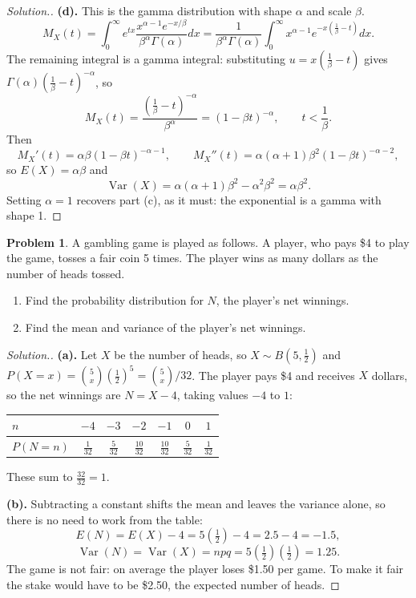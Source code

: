 \documentclass[12pt,a4paper]{report}
\theoremstyle{definition}
\theoremstyle{plain}
\theoremstyle{definition}
\newtheorem{problemx}{Problem}[section]
\newenvironment{problem}{\begin{problemx}}{\end{problemx}}
\newenvironment{solution}
  {\renewcommand{\qedsymbol}{}\begin{proof}[\textit{Solution}.]}
  {\end{proof}}
\begin{document}
\begin{solution}
\textbf{(d).} This is the gamma distribution with shape $\alpha$ and scale $\beta$.
\[M_X(t) = \int_0^{\infty}e^{tx}\frac{x^{\alpha-1}e^{-x/\beta}}{\beta^{\alpha}\Gamma(\alpha)}dx
 = \frac{1}{\beta^{\alpha}\Gamma(\alpha)}\int_0^{\infty}x^{\alpha-1}
   e^{-x\left(\frac{1}{\beta}-t\right)}dx.\]
The remaining integral is a gamma integral: substituting
$u = x\left(\tfrac{1}{\beta}-t\right)$ gives
$\Gamma(\alpha)\left(\tfrac{1}{\beta}-t\right)^{-\alpha}$, so
\[M_X(t) = \frac{\left(\frac{1}{\beta}-t\right)^{-\alpha}}{\beta^{\alpha}}
 = (1-\beta t)^{-\alpha}, \qquad t<\frac{1}{\beta}.\]
Then
\[M_X'(t) = \alpha\beta(1-\beta t)^{-\alpha-1},\qquad
M_X''(t) = \alpha(\alpha+1)\beta^{2}(1-\beta t)^{-\alpha-2},\]
so $E(X) = \alpha\beta$ and
\[\operatorname{Var}(X) = \alpha(\alpha+1)\beta^{2}-\alpha^{2}\beta^{2} = \alpha\beta^{2}.\]
Setting $\alpha = 1$ recovers part (c), as it must: the exponential is a gamma with
shape 1.
\end{solution}

\begin{problem}
A gambling game is played as follows. A player, who pays \$4 to play the game, tosses a
fair coin 5 times. The player wins as many dollars as the number of heads tossed.
\begin{enumerate}
\item[(a).] Find the probability distribution for $N$, the player's net winnings.
\item[(b).] Find the mean and variance of the player's net winnings.
\end{enumerate}
\end{problem}

\begin{solution}
\textbf{(a).} Let $X$ be the number of heads, so $X\sim B\left(5,\tfrac12\right)$ and
$P(X=x) = \binom{5}{x}\left(\tfrac12\right)^{5} = \binom{5}{x}/32$. The player pays \$4
and receives $X$ dollars, so the net winnings are $N = X-4$, taking values $-4$ to $1$:
\begin{table}[H]
\centering
\begin{tabular}{lcccccc}
$n$      & $-4$ & $-3$ & $-2$ & $-1$ & $0$ & $1$\\
\hline
$P(N=n)$ & $\frac{1}{32}$ & $\frac{5}{32}$ & $\frac{10}{32}$ & $\frac{10}{32}$
         & $\frac{5}{32}$ & $\frac{1}{32}$\\
\end{tabular}
\end{table}
These sum to $\tfrac{32}{32}=1$.

\textbf{(b).} Subtracting a constant shifts the mean and leaves the variance alone, so
there is no need to work from the table:
\[E(N) = E(X)-4 = 5\left(\tfrac12\right)-4 = 2.5-4 = -1.5,\]
\[\operatorname{Var}(N) = \operatorname{Var}(X) = npq = 5\left(\tfrac12\right)\left(\tfrac12\right)
 = 1.25.\]
The game is not fair: on average the player loses \$1.50 per game. To make it fair the
stake would have to be \$2.50, the expected number of heads.
\end{solution}
\end{document}
